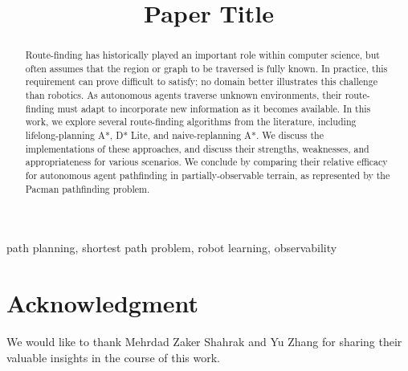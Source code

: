 \documentclass[conference]{IEEEtran}
\begin{document}
\title{Paper Title}

\author{
\and
{}
\and
{}
\and
{}
}

\maketitle

\begin{abstract}
Route-finding has historically played an important role within computer science, but often assumes that the region or graph to be traversed is fully known. In practice, this requirement can prove difficult to satisfy; no domain better illustrates this challenge than robotics. As autonomous agents traverse unknown environments, their route-finding must adapt to incorporate new information as it becomes available. In this work, we explore several route-finding algorithms from the literature, including lifelong-planning A*, D* Lite, and naive-replanning A*. We discuss the implementations of these approaches, and discuss their strengths, weaknesses, and appropriateness for various scenarios. We conclude by comparing their relative efficacy for autonomous agent pathfinding in partially-observable terrain, as represented by the Pacman pathfinding problem.
\end{abstract}

\begin{IEEEkeywords}
path planning, shortest path problem, robot learning, observability
\end{IEEEkeywords}












\section*{Acknowledgment}
We would like to thank Mehrdad Zaker Shahrak and Yu Zhang for sharing their valuable insights in the course of this work.



\end{document}
